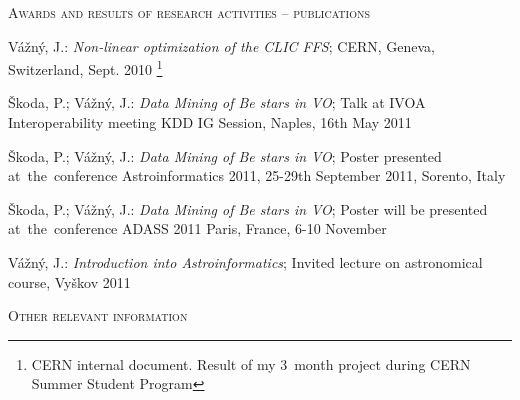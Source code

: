 \documentclass[10pt]{article}
\begin{document}
\begin{cv}
\begin{cvlist}{\large \textsc{Awards and results of research activities -- publications}}

 \item {Vážný}, J.: \textit{Non-linear optimization of the CLIC FFS};
   CERN, Geneva, Switzerland, Sept. 2010 \footnote{CERN internal
     document. Result of my 3~month project during CERN Summer Student
     Program}

\item {Škoda}, P.; {Vážný}, J.: \textit{Data Mining of Be stars in VO};
    Talk at IVOA Interoperability meeting KDD IG Session, Naples, 16th May
    2011 

\item {Škoda}, P.; {Vážný}, J.: \textit{Data Mining of Be stars in VO};
    Poster presented at~the~conference Astroinformatics 2011, 25-29th
    September 2011, Sorento, Italy

\item {Škoda}, P.; {Vážný}, J.: \textit{Data Mining of Be stars in VO};
    Poster will be presented at~the~conference ADASS 2011 Paris,
    France, 6-10 November 



\item {Vážný}, J.: \textit{Introduction into Astroinformatics};
  Invited lecture on astronomical course, Vyškov 2011



\end{cvlist}







\noindent\hrulefill
\begin{cvlist}{\large \textsc{Other relevant information}}




\end{cvlist}
\end{cv}
\end{document}
